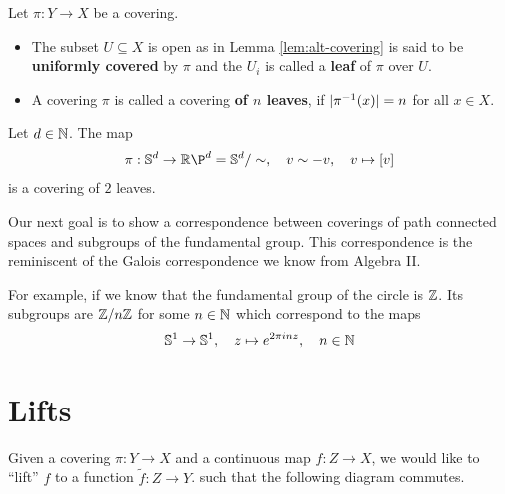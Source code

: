 \begin{dfn}[]
Let $\pi: Y \to  X$ be a covering.
\begin{itemize}
  \item The subset $U \subseteq X$ is open as in Lemma \ref{lem:alt-covering} is said to be \textbf{uniformly covered} by $\pi$ and the $U_i$ is called a \textbf{leaf} of $\pi$ over $U$.
  \item A covering $\pi$ is called a covering \textbf{of $n$ leaves}, if $\vert\pi^{-1}(x)\vert = n$ for all $x \in X$.
\end{itemize}
\end{dfn}


\begin{ex}[]
Let $d \in \mathbb{N}$. The map
\begin{align*}
  \pi: \IS^{d} \to \R\P^{d} = \IS^{d}/\sim, \quad v \sim - v, \quad v \mapsto [v]
\end{align*}
is a covering of $2$ leaves.
\end{ex}


Our next goal is to show a correspondence between coverings of path connected spaces and subgroups of the fundamental group.
This correspondence is the reminiscent of the Galois correspondence we know from Algebra II. 

For example, if we know that the fundamental group of the circle is $\mathbb{Z}$.
Its subgroups are $\mathbb{Z}/n\mathbb{Z}$ for some $n\in \mathbb{N}$ which correspond to the maps
\begin{align*}
  \mathbb{S}^{1} \to  \mathbb{S}^{1}, \quad z \mapsto  e^{2 \pi i n z}, \quad n \in \mathbb{N}
\end{align*}

\section{Lifts}
Given a covering $\pi: Y \to X$ and a continuous map $f: Z \to  X$, we would like to ``lift'' $f$ to a function $\tilde{f}: Z \to  Y$. such that the following diagram commutes.
\begin{center}
\end{center}

